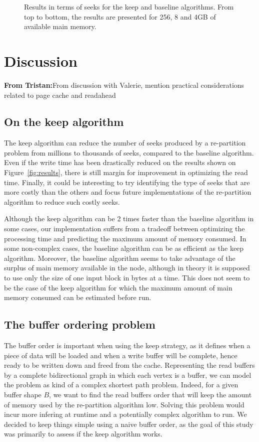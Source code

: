 \documentclass[sigconf, nonacm]{acmart}
\newcommand{\tristan}[1]{\color{orange}\textbf{From Tristan:}#1\color{black}}
\begin{document}
{\begin{figure}
     \caption{Results in terms of seeks for the keep and baseline algorithms. From top to bottom, the results are presented for 256, 8 and 4GB of available main memory.}
     \label{fig:seeks_results}
\end{figure}

\section{Discussion}
\tristan{From discussion with Valerie, mention practical considerations related to page cache and readahead}

\subsection{On the keep algorithm}
The keep algorithm can reduce the number of seeks produced by a re-partition
problem from millions to thousands of seeks, compared to the baseline algorithm.
Even if the write time has been drastically reduced on the results shown on
Figure~\ref{fig:results}, there is still margin for improvement in optimizing
the read time.
Finally, it could be interesting to try identifying the type of seeks that are
more costly than the others and focus future implementations of the re-partition
algorithm to reduce such costly seeks.

Although the keep algorithm can be 2 times faster than the baseline algorithm
in some cases, our implementation suffers from a tradeoff between optimizing
the processing time and predicting the maximum amount of memory consumed.
In some non-complex cases, the baseline algorithm can be as efficient as the
keep algorithm.
Moreover, the baseline algorithm seems to take advantage of the surplus of
main memory available in the node, although in theory it is supposed to use
only the size of one input block in bytes at a time.
This does not seem to be the case of the keep algorithm for which the maximum
amount of main memory consumed can be estimated before run.

\subsection{The buffer ordering problem}
The buffer order is important when using the keep strategy, as it defines when
a piece of data will be loaded and when a write buffer will be complete, hence
ready to be written down and freed from the cache.
Representing the read buffers by a complete bidirectional graph in which each
vertex is a buffer, we can model the problem as kind of a complex shortest path
problem.
Indeed, for a given buffer shape $B$, we want to find the read buffers order
that will keep the amount of memory used by the re-partition algorithm low.
Solving this problem would incur more infering at runtime and a potentially
complex algorithm to run.
We decided to keep things simple using a naive buffer order, as the goal of
this study was primarily to assess if the keep algorithm works.

}
\end{document}
